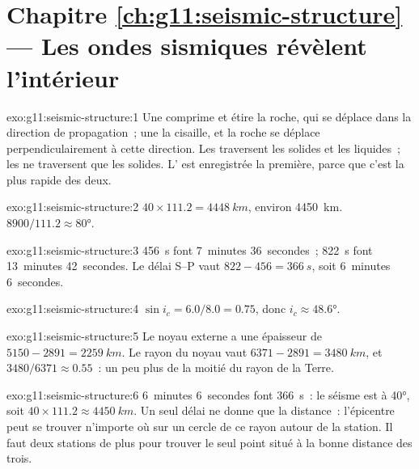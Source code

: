 \section*{Chapitre \ref{ch:g11:seismic-structure} --- Les ondes sismiques révèlent l'intérieur}

\begin{solution}{exo:g11:seismic-structure:1}
Une  comprime et étire la roche, qui se déplace dans la direction de
propagation~; une  la cisaille, et la roche se déplace
perpendiculairement à cette direction. Les  traversent les solides et
les liquides~; les  ne traversent que les solides. L' est
enregistrée la première, parce que c'est la plus rapide des deux.
\end{solution}

\begin{solution}{exo:g11:seismic-structure:2}
$40 \times 111.2 = \qty{4448}{km}$, environ \qty{4450}{km}. $8900/111.2
\approx \ang{80}$.
\end{solution}

\begin{solution}{exo:g11:seismic-structure:3}
\qty{456}{s} font 7~minutes 36~secondes~; \qty{822}{s} font 13~minutes
42~secondes. Le délai S--P vaut $822 - 456 = \qty{366}{s}$, soit 6~minutes
6~secondes.
\end{solution}

\begin{solution}{exo:g11:seismic-structure:4}
$\sin i_c = 6.0/8.0 = 0.75$, donc $i_c \approx \ang{48.6}$.
\end{solution}

\begin{solution}{exo:g11:seismic-structure:5}
Le noyau externe a une épaisseur de $5150 - 2891 = \qty{2259}{km}$. Le rayon
du noyau vaut $6371 - 2891 = \qty{3480}{km}$, et $3480/6371 \approx 0.55$~:
un peu plus de la moitié du rayon de la Terre.
\end{solution}

\begin{solution}{exo:g11:seismic-structure:6}
6~minutes 6~secondes font \qty{366}{s}~: le séisme est à \ang{40}, soit
$40 \times 111.2 \approx \qty{4450}{km}$. Un seul délai ne donne que la
distance~: l'épicentre peut se trouver n'importe où sur un cercle de ce
rayon autour de la station. Il faut deux stations de plus pour trouver le
seul point situé à la bonne distance des trois.
\end{solution}

